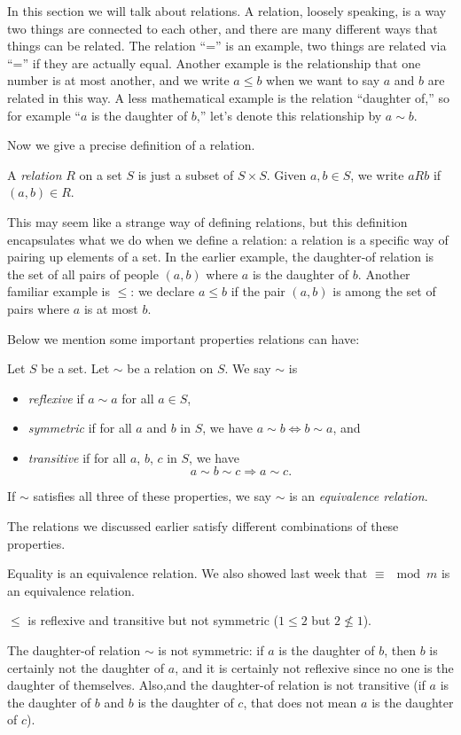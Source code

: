 \documentclass[11pt,dvipsnames]{book}
\numberwithin{figure}{section} %
\numberwithin{table}{section} %
\begin{document}
In this section we will talk about relations. A relation, loosely speaking, is a way two things are connected to each other, and there are many different ways that things can be related. The relation ``='' is an example, two things are related via ``='' if they are actually equal. Another example is the relationship that one number is at most another, and we write $a\leq b$ when we want to say $a$ and $b$ are related in this way. A less mathematical example is the relation ``daughter of,'' so for example ``$a$ is the daughter of $b$,'' let's denote this relationship by $a\sim b$.

Now we give a precise definition of a relation.

\begin{definition}
A {\it relation} $R$ on a set $S$ is just a subset of $S\times S$. Given $a,b\in S$, we write $aRb$ if $(a,b)\in R$.
\end{definition}

This may seem like a strange way of defining relations, but this definition encapsulates what we do when we define a relation: a relation is a specific way of pairing up elements of a set. In the earlier example, the daughter-of relation is the set of all pairs of people $(a,b)$ where $a$ is the daughter of $b$. Another familiar example is $\leq$: we declare $a\leq b$ if the pair $(a,b)$ is among the set of pairs where $a$ is at most $b$.

Below we mention some important properties relations can have:

 \begin{definition}
 Let $S$ be a set. Let $\sim$ be a relation on $S$. We say $\sim$ is
\begin{itemize}
\item {\it reflexive} if $a\sim a$ for all $a\in S$,
 \item {\it symmetric} if for all $a$ and $b$ in $S$,  we have $
a\sim b  \Longleftrightarrow  b\sim a$, and
 \item {\it transitive} if for all $a$, $b$, $c$ in $S$,  we have
\[
a\sim b\sim c\Longrightarrow  a\sim c.\]
\end{itemize}
If $\sim$ satisfies all three of these properties, we say $\sim$ is an {\it equivalence relation}.
\end{definition}

The relations we discussed earlier satisfy different combinations of these properties.

\begin{example}
\item Equality is an equivalence relation. We also showed last week that $\equiv \mod m$ is an equivalence relation.
\item $\leq$ is reflexive and transitive but not symmetric ($1\leq 2$ but $2\not\leq 1$).
\item The daughter-of relation $\sim$ is not symmetric: if $a$ is the daughter of $b$, then $b$ is certainly not the daughter of $a$, and it is certainly not reflexive since no one is the daughter of themselves. Also,and the daughter-of relation is not transitive (if $a$ is the daughter of $b$ and $b$ is the daughter of $c$, that does not mean $a$ is the daughter of $c$).
\end{example}
\end{document}
